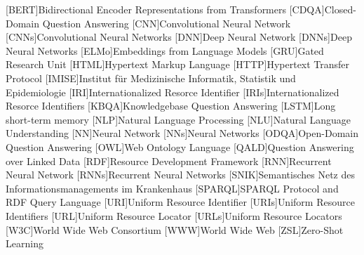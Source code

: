 \begin{acronym}
[BERT]{Bidirectional Encoder Representations from Transformers}
[CDQA]{Closed-Domain Question Answering}
[CNN]{Convolutional Neural Network}
[CNNs]{Convolutional Neural Networks}
[DNN]{Deep Neural Network}
[DNNs]{Deep Neural Networks}
[ELMo]{Embeddings from Language Models}
[GRU]{Gated Research Unit}
[HTML]{Hypertext Markup Language}
[HTTP]{Hypertext Transfer Protocol}
[IMISE]{Institut für Medizinische Informatik, Statistik und Epidemiologie}
[IRI]{Internationalized Resorce Identifier}
[IRIs]{Internationalized Resorce Identifiers}
[KBQA]{Knowledgebase Question Answering}
[LSTM]{Long short-term memory}
[NLP]{Natural Language Processing}
[NLU]{Natural Language Understanding}
[NN]{Neural Network}
[NNs]{Neural Networks}
[ODQA]{Open-Domain Question Answering}
[OWL]{Web Ontology Language}
[QALD]{Question Answering over Linked Data}
[RDF]{Resource Development Framework}
[RNN]{Recurrent Neural Network}
[RNNs]{Recurrent Neural Networks}
[SNIK]{Semantisches Netz des Informationsmanagements im Krankenhaus}
[SPARQL]{SPARQL Protocol and RDF Query Language}
[URI]{Uniform Resource Identifier}
[URIs]{Uniform Resource Identifiers}
[URL]{Uniform Resource Locator}
[URLs]{Uniform Resource Locators}
[W3C]{World Wide Web Consortium}
[WWW]{World Wide Web}
[ZSL]{Zero-Shot Learning}
\end{acronym}
